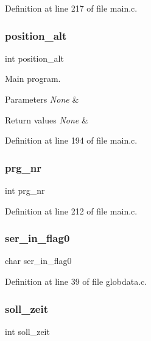 Definition at line 217 of file main.\+c.

\mbox{\label{main_8c_a294274b80da26f3d9bcc144f37790906}} 
\subsubsection{position\+\_\+alt}
{\footnotesize\ttfamily int position\+\_\+alt}



Main program. 


\begin{DoxyParams}{Parameters}
{\em None} & \\
\hline
\end{DoxyParams}

\begin{DoxyRetVals}{Return values}
{\em None} & \\
\hline
\end{DoxyRetVals}


Definition at line 194 of file main.\+c.

\mbox{\label{main_8c_adf905b8e9cc819d71b7d7d59c70544b1}} 
\subsubsection{prg\+\_\+nr}
{\footnotesize\ttfamily int prg\+\_\+nr}



Definition at line 212 of file main.\+c.

\mbox{\label{main_8c_ae833a459aae87f49988d4eaf9e4b77fb}} 
\subsubsection{ser\+\_\+in\+\_\+flag0}
{\footnotesize\ttfamily char ser\+\_\+in\+\_\+flag0}



Definition at line 39 of file globdata.\+c.

\mbox{\label{main_8c_a55e38ae00c77b3a41087dfbf0eddacd6}} 
\subsubsection{soll\+\_\+zeit}
{\footnotesize\ttfamily int soll\+\_\+zeit}



